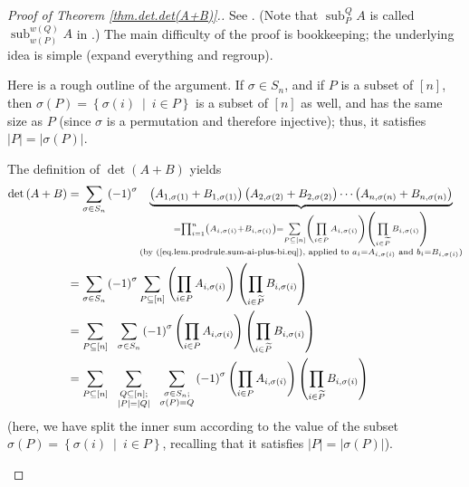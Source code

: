 \begin{proof}
[Proof of Theorem \ref{thm.det.det(A+B)}.]See \cite[Theorem 6.160]{detnotes}.
(Note that $\operatorname*{sub}\nolimits_{P}^{Q}A$ is called
$\operatorname*{sub}\nolimits_{w\left(  P\right)  }^{w\left(  Q\right)  }A$ in
\cite{detnotes}.) The main difficulty of the proof is bookkeeping; the
underlying idea is simple (expand everything and regroup). \medskip

\begin{fineprint}
Here is a rough outline of the argument. If $\sigma\in S_{n}$, and if $P$ is a
subset of $\left[  n\right]  $, then $\sigma\left(  P\right)  =\left\{
\sigma\left(  i\right)  \ \mid\ i\in P\right\}  $ is a subset of $\left[
n\right]  $ as well, and has the same size as $P$ (since $\sigma$ is a
permutation and therefore injective); thus, it satisfies $\left\vert
P\right\vert =\left\vert \sigma\left(  P\right)  \right\vert $.

The definition of $\det\left(  A+B\right)  $ yields%
\begin{align*}
\det\left(  A+B\right)   &  =\sum_{\sigma\in S_{n}}\left(  -1\right)
^{\sigma}\underbrace{\left(  A_{1,\sigma\left(  1\right)  }+B_{1,\sigma\left(
1\right)  }\right)  \left(  A_{2,\sigma\left(  2\right)  }+B_{2,\sigma\left(
2\right)  }\right)  \cdots\left(  A_{n,\sigma\left(  n\right)  }%
+B_{n,\sigma\left(  n\right)  }\right)  }_{\substack{=\prod_{i=1}^{n}\left(
A_{i,\sigma\left(  i\right)  }+B_{i,\sigma\left(  i\right)  }\right)
=\sum\limits_{P\subseteq\left[  n\right]  }\left(  \prod\limits_{i\in
P}A_{i,\sigma\left(  i\right)  }\right)  \left(  \prod\limits_{i\in
\widetilde{P}}B_{i,\sigma\left(  i\right)  }\right)  \\\text{(by
(\ref{eq.lem.prodrule.sum-ai-plus-bi.eq}), applied to }a_{i}=A_{i,\sigma
\left(  i\right)  }\text{ and }b_{i}=B_{i,\sigma\left(  i\right)  }\text{)}%
}}\\
&  =\sum_{\sigma\in S_{n}}\left(  -1\right)  ^{\sigma}\sum\limits_{P\subseteq
\left[  n\right]  }\left(  \prod\limits_{i\in P}A_{i,\sigma\left(  i\right)
}\right)  \left(  \prod\limits_{i\in\widetilde{P}}B_{i,\sigma\left(  i\right)
}\right) \\
&  =\sum\limits_{P\subseteq\left[  n\right]  }\ \ \sum_{\sigma\in S_{n}%
}\left(  -1\right)  ^{\sigma}\left(  \prod\limits_{i\in P}A_{i,\sigma\left(
i\right)  }\right)  \left(  \prod\limits_{i\in\widetilde{P}}B_{i,\sigma\left(
i\right)  }\right) \\
&  =\sum\limits_{P\subseteq\left[  n\right]  }\ \ \sum_{\substack{Q\subseteq
\left[  n\right]  ;\\\left\vert P\right\vert =\left\vert Q\right\vert
}}\ \ \sum_{\substack{\sigma\in S_{n};\\\sigma\left(  P\right)  =Q}}\left(
-1\right)  ^{\sigma}\left(  \prod\limits_{i\in P}A_{i,\sigma\left(  i\right)
}\right)  \left(  \prod\limits_{i\in\widetilde{P}}B_{i,\sigma\left(  i\right)
}\right)
\end{align*}
(here, we have split the inner sum according to the value of the subset
$\sigma\left(  P\right)  =\left\{  \sigma\left(  i\right)  \ \mid\ i\in
P\right\}  $, recalling that it satisfies $\left\vert P\right\vert =\left\vert
\sigma\left(  P\right)  \right\vert $).


\end{fineprint}
\end{proof}
